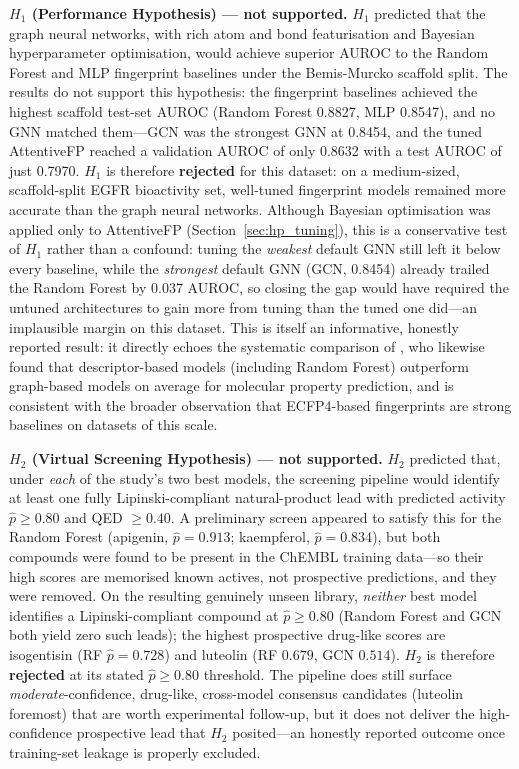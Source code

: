 \textbf{$H_1$ (Performance Hypothesis) --- not supported.} $H_1$ predicted that the
graph neural networks, with rich atom and bond featurisation and Bayesian
hyperparameter optimisation, would achieve superior AUROC to the Random Forest and
MLP fingerprint baselines under the Bemis-Murcko scaffold split. The results do not
support this hypothesis: the fingerprint baselines achieved the highest scaffold
test-set AUROC (Random Forest 0.8827, MLP 0.8547), and no GNN matched them---GCN was
the strongest GNN at 0.8454, and the tuned AttentiveFP reached a validation AUROC of
only 0.8632 with a test AUROC of just 0.7970. $H_1$ is therefore
\textbf{rejected} for this dataset: on a medium-sized, scaffold-split EGFR
bioactivity set, well-tuned fingerprint models remained more accurate than the graph
neural networks. Although Bayesian optimisation was applied only to AttentiveFP
(Section~\ref{sec:hp_tuning}), this is a conservative test of $H_1$ rather than a
confound: tuning the \emph{weakest} default GNN still left it below every baseline,
while the \emph{strongest} default GNN (GCN, 0.8454) already trailed the Random Forest
by 0.037 AUROC, so closing the gap would have required the untuned architectures to
gain more from tuning than the tuned one did---an implausible margin on this dataset. This is itself an informative, honestly reported result: it directly
echoes the systematic comparison of \textcite{jiang2021gnn}, who likewise found that
descriptor-based models (including Random Forest) outperform graph-based models on
average for molecular property prediction, and is consistent with the broader
observation that ECFP4-based fingerprints are strong baselines on datasets of this
scale.

\textbf{$H_2$ (Virtual Screening Hypothesis) --- not supported.} $H_2$ predicted
that, under \emph{each} of the study's two best models, the screening pipeline would
identify at least one fully Lipinski-compliant natural-product lead with predicted
activity $\hat{p} \geq 0.80$ and QED $\geq 0.40$. A preliminary screen appeared to
satisfy this for the Random Forest (apigenin, $\hat{p} = 0.913$; kaempferol,
$\hat{p} = 0.834$), but both compounds were found to be present in the ChEMBL training
data---so their high scores are memorised known actives, not prospective predictions,
and they were removed. On the resulting genuinely unseen library, \emph{neither} best
model identifies a Lipinski-compliant compound at $\hat{p} \geq 0.80$ (Random Forest
and GCN both yield zero such leads); the highest prospective drug-like scores are
isogentisin (RF $\hat{p} = 0.728$) and luteolin (RF $0.679$, GCN $0.514$). $H_2$ is
therefore \textbf{rejected} at its stated $\hat{p} \geq 0.80$ threshold. The pipeline
does still surface \emph{moderate}-confidence, drug-like, cross-model consensus
candidates (luteolin foremost) that are worth experimental follow-up, but it does not
deliver the high-confidence prospective lead that $H_2$ posited---an honestly reported
outcome once training-set leakage is properly excluded.

